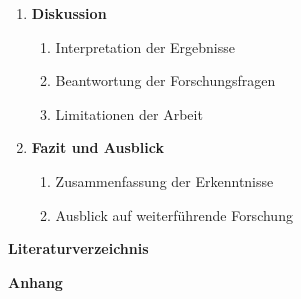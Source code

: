 \begin{enumerate}[leftmargin=*, label=\arabic*, font=\bfseries, noitemsep]
	\item\textbf{Diskussion}
	      \begin{enumerate}[label=\theenumi.\arabic*, noitemsep]
		      \item Interpretation der Ergebnisse
		      \item Beantwortung der Forschungsfragen
		      \item Limitationen der Arbeit
	      \end{enumerate}

	\item\textbf{Fazit und Ausblick}
	      \begin{enumerate}[label=\theenumi.\arabic*, noitemsep]
		      \item Zusammenfassung der Erkenntnisse
		      \item Ausblick auf weiterführende Forschung
	      \end{enumerate}
\end{enumerate}

\vspace{1em}

\noindent\textbf{Literaturverzeichnis}
\par\noindent\textbf{Anhang}
